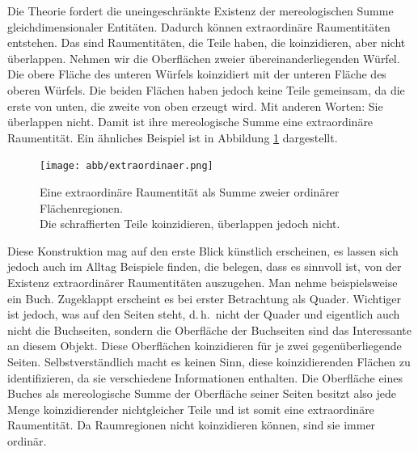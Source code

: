 		Die Theorie fordert die uneingeschränkte Existenz der mereologischen Summe gleichdimensionaler Entitäten. Dadurch können extraordinäre Raumentitäten entstehen. Das sind Raumentitäten, die Teile haben, die koinzidieren, aber nicht überlappen.
		Nehmen wir die Oberflächen zweier übereinanderliegenden Würfel. 
		Die obere Fläche des unteren Würfels koinzidiert mit der unteren Fläche des oberen Würfels. Die beiden Flächen haben jedoch keine Teile gemeinsam, da die erste von unten, die zweite von oben erzeugt wird. 
		Mit anderen Worten: Sie überlappen nicht. Damit ist ihre mereologische Summe eine extraordinäre Raumentität.
		Ein ähnliches Beispiel ist in Abbildung \ref{fig:extraordinaer} dargestellt.
        \begin{figure}[ht]
            \centering
            \texttt{[image: abb/extraordinaer.png]}
            \caption[Eine extraordinäre Raumentität als Summe zweier ordinärer Flächenregionen]{Eine extraordinäre Raumentität als Summe zweier ordinärer Flächenregionen.\\
            Die schraffierten Teile koinzidieren, überlappen jedoch nicht.}
            \label{fig:extraordinaer}
        \end{figure}
		Diese Konstruktion mag auf den erste Blick künstlich erscheinen, es lassen sich jedoch auch im Alltag Beispiele finden, die belegen, dass es sinnvoll ist, von der Existenz extraordinärer Raumentitäten auszugehen. 
		Man nehme beispielsweise ein Buch. 
		Zugeklappt erscheint es bei erster Betrachtung als Quader. 
		Wichtiger ist jedoch, was auf den Seiten steht, d.\,h.\ nicht der Quader und eigentlich auch nicht die Buchseiten, sondern die Oberfläche der Buchseiten sind das Interessante an diesem Objekt. 
		Diese Oberflächen koinzidieren für je zwei gegenüberliegende Seiten.
		Selbstverständlich macht es keinen Sinn, diese koinzidierenden Flächen zu identifizieren, da sie verschiedene Informationen enthalten. 
		Die Oberfläche eines Buches als mereologische Summe der Oberfläche seiner Seiten besitzt also jede Menge koinzidierender nichtgleicher Teile und ist somit eine extraordinäre Raumentität.
		Da Raumregionen nicht koinzidieren können, sind sie immer ordinär.

